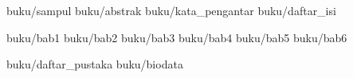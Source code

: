 \documentclass[a4paper, twoside, 11pt, listof=nochaptergap] {book}
\begin{document}
  
  \pagestyle {normal}
  
  \frontmatter
     {buku/sampul}
     {buku/abstrak}
     {buku/kata_pengantar}
     {buku/daftar_isi}
  
  \mainmatter
     {buku/bab1} \cleardoublepage
     {buku/bab2} \cleardoublepage
     {buku/bab3} \cleardoublepage
     {buku/bab4} \cleardoublepage
     {buku/bab5} \cleardoublepage
     {buku/bab6} \cleardoublepage
  
  \backmatter
     {buku/daftar_pustaka}
     {buku/biodata}
\end{document}
